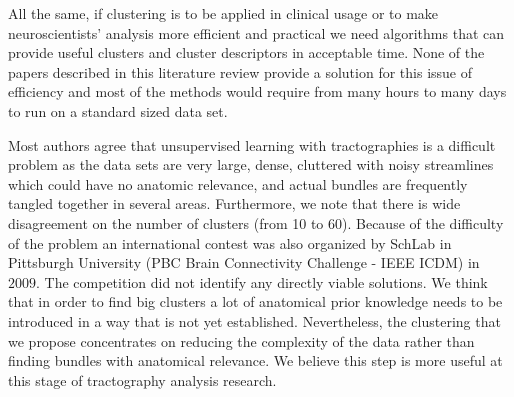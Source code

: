 \documentclass{bioinfo}
\begin{document}
All the same, if clustering is to be applied in clinical usage or to
make neuroscientists' analysis more efficient and practical we need
algorithms that can provide useful clusters and cluster descriptors in
acceptable time. None of the papers described in this literature review
provide a solution for this issue of efficiency and most of the methods
would require from many hours to many days to run on a standard sized
data set.


Most authors agree that unsupervised learning with tractographies is a
difficult problem as the data sets are very large, dense, cluttered with
noisy streamlines which could have no anatomic relevance, and actual
bundles are frequently tangled together in several areas. Furthermore,
we note that there is wide disagreement on the number of clusters
(from 10 to 60). Because of the difficulty of the problem an
international contest was also organized by SchLab in Pittsburgh
University (PBC Brain Connectivity Challenge - IEEE ICDM) in
$2009$. The competition did not identify any directly
viable solutions. We think that in order to find big clusters a lot of
anatomical prior knowledge needs to be introduced in a way that is not
yet established.  Nevertheless, the clustering that we propose
concentrates on reducing the complexity of the data rather than finding
bundles with anatomical relevance. We believe this step is more useful
at this stage of tractography analysis research.
\end{document}
